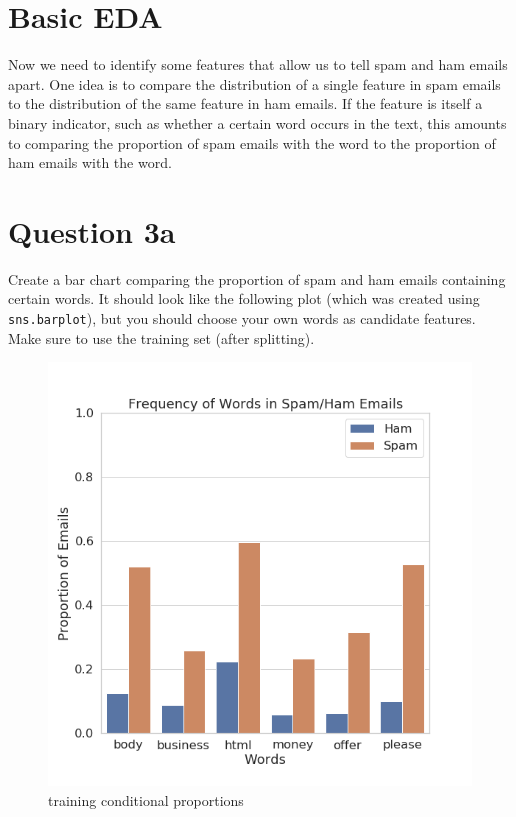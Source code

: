 \documentclass[11pt]{article}
\makeatletter
\def\maxwidth{\ifdim\Gin@nat@width>\linewidth\linewidth
    \else\Gin@nat@width\fi}
\let\Oldincludegraphics\includegraphics
\renewcommand{\includegraphics}[1]{\Oldincludegraphics[width=.8\maxwidth]{#1}}
\makeatother
\begin{document}
    \section{Basic EDA}\label{basic-eda}

Now we need to identify some features that allow us to tell spam and ham
emails apart. One idea is to compare the distribution of a single
feature in spam emails to the distribution of the same feature in ham
emails. If the feature is itself a binary indicator, such as whether a
certain word occurs in the text, this amounts to comparing the
proportion of spam emails with the word to the proportion of ham emails
with the word.

    \section{Question 3a}\label{question-3a}

Create a bar chart comparing the proportion of spam and ham emails
containing certain words. It should look like the following plot (which
was created using \texttt{sns.barplot}), but you should choose your own
words as candidate features. Make sure to use the training set (after
splitting).

\begin{figure}
\centering
\includegraphics{./images/training_conditional_proportions.png}
\caption{training conditional proportions}
\end{figure}
\end{document}

